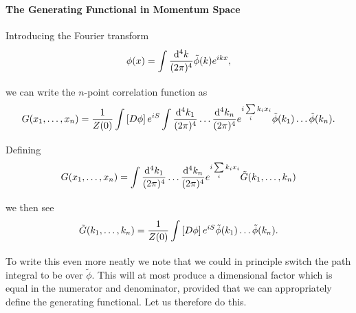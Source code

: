 \paragraph{The Generating Functional in Momentum Space}
Introducing the Fourier transform
\begin{align*}
	\phi(x) = \int\limits_{}^{}\frac{\dd[4]{k}}{(2\pi)^{4}}\tilde{\phi}(k)e^{ikx},
\end{align*}
we can write the $n$-point correlation function as
\begin{align*}
	G(x_{1}, \dots, x_{n}) = \frac{1}{Z(0)}\int\limits_{}\left[D\phi\right]e^{iS}\int\limits_{}^{}\frac{\dd[4]{k_{1}}}{(2\pi)^{4}}\dots \frac{\dd[4]{k_{n}}}{(2\pi)^{4}}e^{i\sum\limits_{i}k_{i}x_{i}}\tilde{\phi}(k_{1})\dots \tilde{\phi}(k_{n}).
\end{align*}
Defining
\begin{align*}
	G(x_{1}, \dots, x_{n}) = \int\limits_{}^{}\frac{\dd[4]{k_{1}}}{(2\pi)^{4}}\dots \frac{\dd[4]{k_{n}}}{(2\pi)^{4}}e^{i\sum\limits_{i}k_{i}x_{i}}\tilde{G}(k_{1}, \dots, k_{n})
\end{align*}
we then see
\begin{align*}
	\tilde{G}(k_{1}, \dots, k_{n}) = \frac{1}{Z(0)}\int\limits_{}\left[D\phi\right]e^{iS}\tilde{\phi}(k_{1})\dots \tilde{\phi}(k_{n}).
\end{align*}
To write this even more neatly we note that we could in principle switch the path integral to be over $\tilde{\phi}$. This will at most produce a dimensional factor which is equal in the numerator and denominator, provided that we can appropriately define the generating functional. Let us therefore do this.

